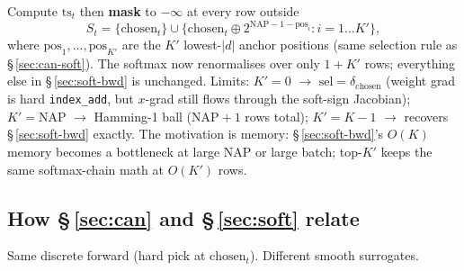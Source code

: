\documentclass[11pt]{article}
\begin{document}
Compute $\mathrm{ts}_t$ then \textbf{mask} to $-\infty$ at every row outside
\[
  S_t = \{\mathrm{chosen}_t\}\cup \bigl\{\mathrm{chosen}_t\oplus 2^{\mathrm{NAP}-1-\mathrm{pos}_i}:i=1\ldots K'\bigr\},
\]
where $\mathrm{pos}_1,\ldots,\mathrm{pos}_{K'}$ are the $K'$ lowest-$|d|$ anchor positions
(same selection rule as \S\,\ref{sec:can-soft}). The softmax now
renormalises over only $1{+}K'$ rows; everything else in \S\,\ref{sec:soft-bwd}
is unchanged. Limits: $K'{=}0$ $\to$ $\mathrm{sel}=\delta_{\mathrm{chosen}}$
(weight grad is hard \texttt{index\_add}, but $x$-grad still flows through
the soft-sign Jacobian); $K'{=}\mathrm{NAP}$ $\to$ Hamming-1 ball
($\mathrm{NAP}{+}1$ rows total); $K'{=}K{-}1$ $\to$ recovers \S\,\ref{sec:soft-bwd}
exactly. The motivation is memory: \S\,\ref{sec:soft-bwd}'s $O(K)$ memory
becomes a bottleneck at large NAP or large batch; top-$K'$ keeps the same
softmax-chain math at $O(K')$ rows.

\subsection{How \S\,\ref{sec:can} and \S\,\ref{sec:soft} relate}

Same discrete forward (hard pick at $\mathrm{chosen}_t$). Different smooth
surrogates.
\end{document}

